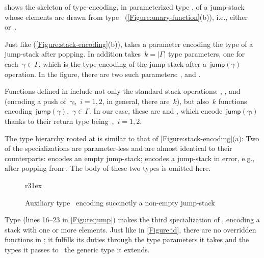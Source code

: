 \documentclass[a4paper,USenglish]{lipics-v2016}
\def\ReplaceInThesis#1#2{#1}
\begin{document}
 shows the skeleton of type-encoding, in parameterized type ,
  of a jump-stack whose elements are drawn from type~
  (\ReplaceInThesis{\cref{Figure:unary-function}(b)}{\cref{Figure:unary-function-b}}), i.e., either~ or~.

Just like  (\cref{Figure:stack-encoding\ReplaceInThesis{}{-b}}\ReplaceInThesis{(b)}{}),  takes
  a  parameter encoding the type of a jump-stack after popping.
In addition  takes~$k=|Γ|$ type parameters, one for each~$γ∈Γ$,
  which is the type encoding of the jump-stack after a~$\textsf{jump}(γ)$
  operation.
In the figure, there are two such parameters: , and
  .

Functions defined in  include not only the standard stack operations: ,
,  and~ (encoding a push of~$γᵢ$,~$i=1,2$, in general, there are~$k$),
but also~$k$ functions encoding~$\textsf{jump}(γ)$,~$γ∈Γ$.
In our case, these are  and ,
  which encode~$\textsf{jump}(γᵢ)$
  thanks to their return type being~,~$i=1,2$.

The type hierarchy rooted at  is similar to that of
\cref{Figure:stack-encoding\ReplaceInThesis{}{-a}}\ReplaceInThesis{(a)}{}:
Two of the specializations are parameter-less and are
  almost identical to their 
  counterparts:
 encodes an empty jump-stack;  encodes a jump-stack in error,
e.g., after popping from .
The body of these two types is omitted here.

\ReplaceInThesis{\begin{wrapfigure}[11]r{31ex}
  \caption{\label{Figure:jump-stack-push} Auxiliary type~\cc{Pʹ} encoding succinctly a non-empty jump-stack}
  \javaInput[minipage,width=31ex,listing style=numbered]{jump-stack-push.listing}
\end{wrapfigure}
}{  \begin{figure}[ht]
  \caption{\label{Figure:jump-stack-push} Auxiliary type~\cc{Pʹ} encoding succinctly a non-empty jump-stack}
  \javaInput[minipage,width=\linewidth,listing style=numbered]{jump-stack-push.listing}
\end{figure}
}
Type  (lines 16--23 in \cref{Figure:jump}) makes the third specialization of , encoding
  a stack with one or more elements.
Just like in \cref{Figure:id}, there are no overridden functions in ; it fulfills
  its duties through the type parameters it takes and the types it passes
  to~ the generic type it extends.
\end{document}
